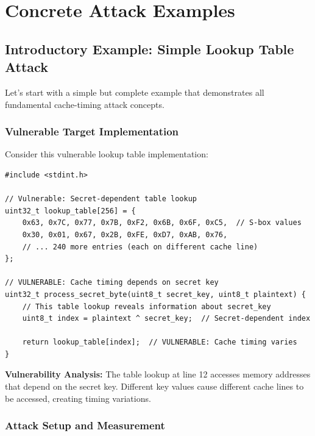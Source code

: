 \documentclass[11pt,a4paper]{article}
\theoremstyle{definition}
\begin{document}
\section{Concrete Attack Examples}

\subsection{Introductory Example: Simple Lookup Table Attack}

Let's start with a simple but complete example that demonstrates all fundamental cache-timing attack concepts.

\subsubsection{Vulnerable Target Implementation}

Consider this vulnerable lookup table implementation:

\begin{lstlisting}[caption={Simple Vulnerable Lookup Table}]
#include <stdint.h>

// Vulnerable: Secret-dependent table lookup
uint32_t lookup_table[256] = {
    0x63, 0x7C, 0x77, 0x7B, 0xF2, 0x6B, 0x6F, 0xC5,  // S-box values
    0x30, 0x01, 0x67, 0x2B, 0xFE, 0xD7, 0xAB, 0x76,
    // ... 240 more entries (each on different cache line)
};

// VULNERABLE: Cache timing depends on secret key
uint32_t process_secret_byte(uint8_t secret_key, uint8_t plaintext) {
    // This table lookup reveals information about secret_key
    uint8_t index = plaintext ^ secret_key;  // Secret-dependent index
    
    return lookup_table[index];  // VULNERABLE: Cache timing varies
}
\end{lstlisting}

\textbf{Vulnerability Analysis:} The table lookup at line 12 accesses memory addresses that depend on the secret key. Different key values cause different cache lines to be accessed, creating timing variations.

\subsubsection{Attack Setup and Measurement}
\end{document}
